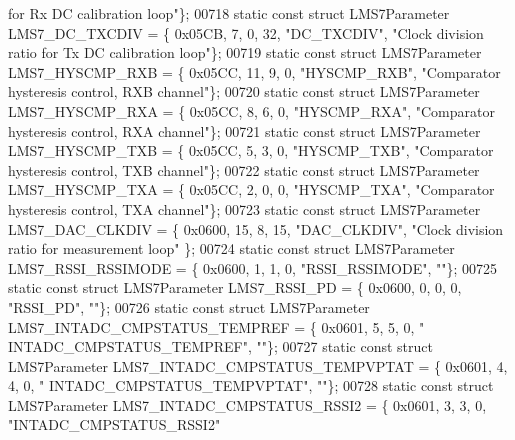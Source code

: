 \begin{DoxyCode}
{       for Rx DC calibration loop"}\};
00718 \textcolor{keyword}{static} \textcolor{keyword}{const} \textcolor{keyword}{struct }LMS7Parameter LMS7_DC_TXCDIV = \{ 0x05CB, 7, 0, 32, \textcolor{stringliteral}{"DC\_TXCDIV"}, \textcolor{stringliteral}{"Clock division ratio
       for Tx DC calibration loop"}\};
00719 \textcolor{keyword}{static} \textcolor{keyword}{const} \textcolor{keyword}{struct }LMS7Parameter LMS7_HYSCMP_RXB = \{ 0x05CC, 11, 9, 0, \textcolor{stringliteral}{"HYSCMP\_RXB"}, \textcolor{stringliteral}{"Comparator
       hysteresis control, RXB channel"}\};
00720 \textcolor{keyword}{static} \textcolor{keyword}{const} \textcolor{keyword}{struct }LMS7Parameter LMS7_HYSCMP_RXA = \{ 0x05CC, 8, 6, 0, \textcolor{stringliteral}{"HYSCMP\_RXA"}, \textcolor{stringliteral}{"Comparator hysteresis
       control, RXA channel"}\};
00721 \textcolor{keyword}{static} \textcolor{keyword}{const} \textcolor{keyword}{struct }LMS7Parameter LMS7_HYSCMP_TXB = \{ 0x05CC, 5, 3, 0, \textcolor{stringliteral}{"HYSCMP\_TXB"}, \textcolor{stringliteral}{"Comparator hysteresis
       control, TXB channel"}\};
00722 \textcolor{keyword}{static} \textcolor{keyword}{const} \textcolor{keyword}{struct }LMS7Parameter LMS7_HYSCMP_TXA = \{ 0x05CC, 2, 0, 0, \textcolor{stringliteral}{"HYSCMP\_TXA"}, \textcolor{stringliteral}{"Comparator hysteresis
       control, TXA channel"}\};
00723 \textcolor{keyword}{static} \textcolor{keyword}{const} \textcolor{keyword}{struct }LMS7Parameter LMS7_DAC_CLKDIV = \{ 0x0600, 15, 8, 15, \textcolor{stringliteral}{"DAC\_CLKDIV"}, \textcolor{stringliteral}{"Clock division
       ratio for measurement loop"} \};
00724 \textcolor{keyword}{static} \textcolor{keyword}{const} \textcolor{keyword}{struct }LMS7Parameter LMS7_RSSI_RSSIMODE = \{ 0x0600, 1, 1, 0, \textcolor{stringliteral}{"RSSI\_RSSIMODE"}, \textcolor{stringliteral}{""}\};
00725 \textcolor{keyword}{static} \textcolor{keyword}{const} \textcolor{keyword}{struct }LMS7Parameter LMS7_RSSI_PD = \{ 0x0600, 0, 0, 0, \textcolor{stringliteral}{"RSSI\_PD"}, \textcolor{stringliteral}{""}\};
00726 \textcolor{keyword}{static} \textcolor{keyword}{const} \textcolor{keyword}{struct }LMS7Parameter LMS7_INTADC_CMPSTATUS_TEMPREF = \{ 0x0601, 5, 5, 0, \textcolor{stringliteral}{"
      INTADC\_CMPSTATUS\_TEMPREF"}, \textcolor{stringliteral}{""}\};
00727 \textcolor{keyword}{static} \textcolor{keyword}{const} \textcolor{keyword}{struct }LMS7Parameter LMS7_INTADC_CMPSTATUS_TEMPVPTAT = \{ 0x0601, 4, 4, 0, \textcolor{stringliteral}{"
      INTADC\_CMPSTATUS\_TEMPVPTAT"}, \textcolor{stringliteral}{""}\};
00728 \textcolor{keyword}{static} \textcolor{keyword}{const} \textcolor{keyword}{struct }LMS7Parameter LMS7_INTADC_CMPSTATUS_RSSI2 = \{ 0x0601, 3, 3, 0, \textcolor{stringliteral}{"INTADC\_CMPSTATUS\_RSSI2"}

\end{DoxyCode}
